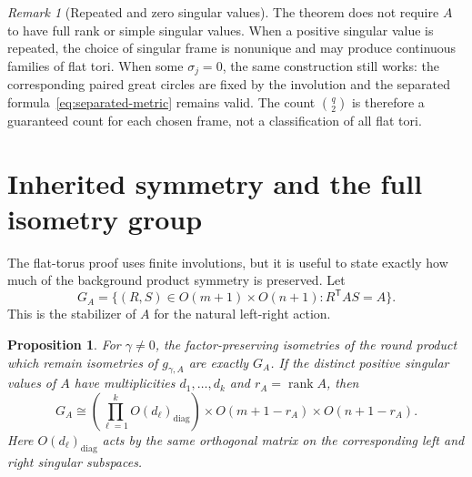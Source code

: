\documentclass[11pt]{amsart}
\newtheorem{proposition}[theorem]{Proposition}
\theoremstyle{definition}
\theoremstyle{remark}
\newtheorem{remark}[theorem]{Remark}
\DeclareMathOperator{\rank}{rank}
\begin{document}
\begin{remark}[Repeated and zero singular values]
The theorem does not require $A$ to have full rank or simple singular
values.  When a positive singular value is repeated, the choice of
singular frame is nonunique and may produce continuous families of
flat tori.  When some $\sigma_j=0$, the same construction still works:
the corresponding paired great circles are fixed by the involution
and the separated formula~\eqref{eq:separated-metric} remains valid.
The count $\binom q2$ is therefore a guaranteed count for each chosen
frame, not a classification of all flat tori.
\end{remark}

\section{Inherited symmetry and the full isometry group}\label{sec:symmetry}

The flat-torus proof uses finite involutions, but it is useful to state
exactly how much of the background product symmetry is preserved.  Let
\begin{equation}\label{eq:GA}
 G_A=\big\{(R,S)\in O(m+1)\times O(n+1):
 R^{\mathsf T}AS=A\big\}.
\end{equation}
This is the stabilizer of $A$ for the natural left-right action.

\begin{proposition}\label{prop:symmetry}
For $\gamma\neq0$, the factor-preserving isometries of the round
product which remain isometries of $g_{\gamma,A}$ are exactly $G_A$.
If the distinct positive singular values of $A$ have multiplicities
$d_1,\ldots,d_k$ and $r_A=\rank A$, then
\begin{equation}\label{eq:GA-structure}
 G_A\cong
 \left(\prod_{\ell=1}^k O(d_\ell)_{\mathrm{diag}}\right)
 \times O(m+1-r_A)\times O(n+1-r_A).
\end{equation}
Here $O(d_\ell)_{\mathrm{diag}}$ acts by the same orthogonal matrix on
the corresponding left and right singular subspaces.
\end{proposition}
\end{document}
